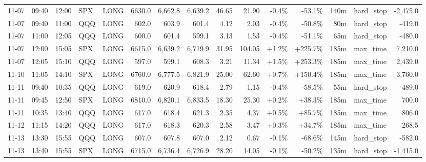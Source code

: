 \documentclass[11pt,a4paper,twoside]{article}
\begin{document}
\begin{landscape}
\begin{center}
\begin{longtable}{>{\color{txtmain}}l l l l l r r r r r r r r >{\color{txtmain}}l r}
11-07 & 09:40 & 12:00 & SPX & LONG & 6630.0 & 6,662.8 & 6,639.2 & 46.65 & 21.90 & \textcolor{lossred}{-0.4\%} & \textcolor{lossred}{-53.1\%} & 140m & hard\_stop & \textcolor{lossred}{-2,475.0} \\
11-07 & 09:40 & 11:00 & QQQ & LONG & 602.0 & 603.9 & 601.4 & 4.12 & 2.03 & \textcolor{lossred}{-0.4\%} & \textcolor{lossred}{-50.8\%} & 80m & hard\_stop & \textcolor{lossred}{-419.0} \\
11-07 & 11:00 & 12:05 & QQQ & LONG & 600.0 & 601.4 & 599.1 & 3.13 & 1.53 & \textcolor{lossred}{-0.4\%} & \textcolor{lossred}{-51.1\%} & 65m & hard\_stop & \textcolor{lossred}{-480.0} \\
11-07 & 12:00 & 15:05 & SPX & LONG & 6615.0 & 6,639.2 & 6,719.9 & 31.95 & 104.05 & \textcolor{wingreen}{+1.2\%} & \textcolor{wingreen}{+225.7\%} & 185m & max\_time & \textcolor{wingreen}{7,210.0} \\
11-07 & 12:05 & 15:10 & QQQ & LONG & 597.0 & 599.1 & 608.3 & 3.21 & 11.34 & \textcolor{wingreen}{+1.5\%} & \textcolor{wingreen}{+253.3\%} & 185m & max\_time & \textcolor{wingreen}{2,439.0} \\
11-10 & 11:05 & 14:10 & SPX & LONG & 6760.0 & 6,777.5 & 6,821.9 & 25.00 & 62.60 & \textcolor{wingreen}{+0.7\%} & \textcolor{wingreen}{+150.4\%} & 185m & max\_time & \textcolor{wingreen}{3,760.0} \\
11-11 & 09:40 & 10:35 & QQQ & LONG & 619.0 & 620.9 & 618.4 & 2.79 & 1.15 & \textcolor{lossred}{-0.4\%} & \textcolor{lossred}{-58.5\%} & 55m & hard\_stop & \textcolor{lossred}{-489.0} \\
11-11 & 09:45 & 12:50 & SPX & LONG & 6810.0 & 6,820.1 & 6,833.5 & 18.30 & 25.30 & \textcolor{wingreen}{+0.2\%} & \textcolor{wingreen}{+38.3\%} & 185m & max\_time & \textcolor{wingreen}{700.0} \\
11-11 & 10:35 & 13:40 & QQQ & LONG & 617.0 & 618.4 & 621.3 & 2.35 & 4.37 & \textcolor{wingreen}{+0.5\%} & \textcolor{wingreen}{+85.7\%} & 185m & max\_time & \textcolor{wingreen}{806.0} \\
11-12 & 11:15 & 14:20 & QQQ & LONG & 617.0 & 618.3 & 620.3 & 2.58 & 3.47 & \textcolor{wingreen}{+0.3\%} & \textcolor{wingreen}{+34.7\%} & 185m & max\_time & \textcolor{wingreen}{268.5} \\
11-13 & 13:30 & 15:55 & QQQ & LONG & 607.0 & 607.8 & 607.0 & 2.12 & 0.67 & \textcolor{lossred}{-0.1\%} & \textcolor{lossred}{-68.6\%} & 145m & hard\_stop & \textcolor{lossred}{-582.0} \\
11-13 & 13:40 & 15:55 & SPX & LONG & 6715.0 & 6,736.4 & 6,726.9 & 28.20 & 14.05 & \textcolor{lossred}{-0.1\%} & \textcolor{lossred}{-50.2\%} & 135m & hard\_stop & \textcolor{lossred}{-1,415.0} \\

\end{longtable}
\end{center}
\end{landscape}
\end{document}
